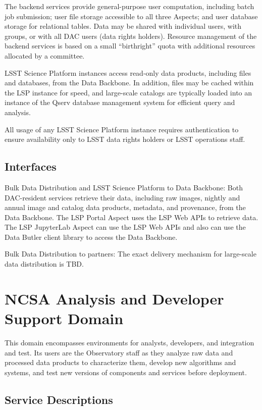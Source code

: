 \documentclass[DM,toc]{lsstdoc}
\begin{document}
The backend services provide general-purpose user computation, including
batch job submission; user file storage accessible to all three Aspects;
and user database storage for relational tables.  Data may be shared with
individual users, with groups, or with all DAC users (data rights
holders). Resource management of the backend services is based on a
small ``birthright'' quota with additional resources allocated by a
committee.

LSST Science Platform instances access read-only data products, including files and databases, from the Data Backbone.
In addition, files may be cached within the LSP instance for speed, and large-scale catalogs are typically loaded into an instance of the Qserv database management system for efficient query and analysis.

All usage of any LSST Science Platform instance requires authentication
to ensure availability only to LSST data rights holders or LSST
operations staff.

\subsection{Interfaces}\label{dac-interfaces}

Bulk Data Distribution and LSST Science Platform to Data Backbone: Both
DAC-resident services retrieve their data, including raw images, nightly and
annual image and catalog data products, metadata, and provenance, from the Data
Backbone.  The LSP Portal Aspect uses the LSP Web APIs to retrieve data.  The
LSP JupyterLab Aspect can use the LSP Web APIs and also can use the Data Butler
client library to access the Data Backbone.

Bulk Data Distribution to partners: The exact delivery mechanism for
large-scale data distribution is TBD.


\section{NCSA Analysis and Developer Support
Domain}\label{ncsa-analysis-and-developer-support-domain}

This domain encompasses environments for analysts, developers, and
integration and test. Its users are the Observatory staff as they
analyze raw data and processed data products to characterize them,
develop new algorithms and systems, and test new versions of components
and services before deployment.

\subsection{Service Descriptions}\label{ncsa-ads-service-descriptions}
\end{document}
